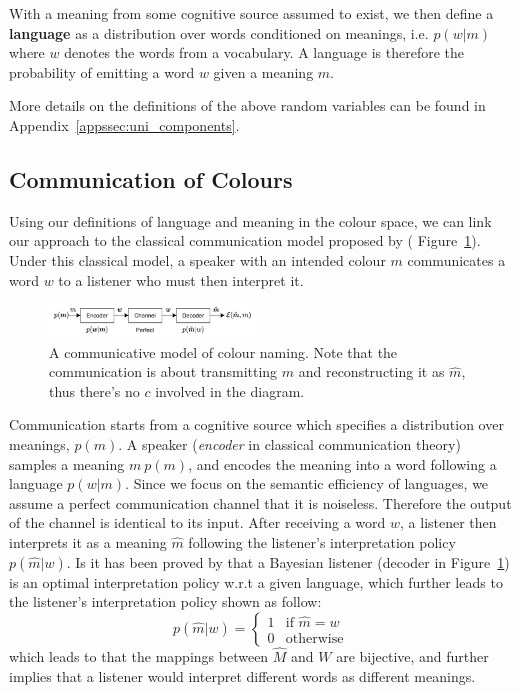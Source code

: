\documentclass[11pt]{article}
\begin{document}
With a meaning from some cognitive source assumed to exist, we then define a \textbf{language} as a distribution over words conditioned on meanings, i.e. $p(w|m)$ where $w$ denotes the words from a vocabulary.
A language is therefore the probability of emitting a word $w$ given a meaning $m$.

More details on the definitions of the above random variables can be found in Appendix~\ref{appssec:uni_components}.

\subsection{Communication of Colours}
\label{ssec:method_comm}

Using our definitions of language and meaning in the colour space, we can link our approach to the classical communication model proposed by \citet{shannon1948mathematical} ( Figure~\ref{fig:pipeline}).
Under this classical model, a speaker with an intended colour $m$ communicates a word $w$ to a listener who must then interpret it.

\begin{figure}[h]
    \centering
    \includegraphics[width=0.49\textwidth]{graphs/cog_communication.pdf}
    \caption{
        A communicative model of colour naming.
        Note that the communication is about transmitting $m$ and reconstructing it as $\hat{m}$, thus there's no $c$ involved in the diagram.
    }
    \label{fig:pipeline}
\end{figure}

Communication starts from a cognitive source which specifies a distribution over meanings, $p(m)$. 
A speaker (\textit{encoder} in classical communication theory) samples a meaning $m~p(m)$, and encodes the meaning into a word following a language $p(w|m)$.
Since we focus on the semantic efficiency of languages, we assume a perfect communication channel that it is noiseless. 
Therefore the output of the channel is identical to its input.
After receiving a word $w$, a listener then interprets it as a meaning $\hat{m}$ following the listener's interpretation policy $p(\hat{m}|w)$.
Is it has been proved by \citet{zaslavsky2018efficient} that a Bayesian listener (decoder in Figure~\ref{fig:pipeline}) is an optimal interpretation policy w.r.t a given language, which further leads to the listener's interpretation policy shown as follow:
\begin{equation}
        p(\hat{m}|w) =
        \begin{cases}
            1 & \text{if $\hat{m}=w$}\\
            0 & \text{otherwise}
        \end{cases} 
        \label{eq:comm_listener}
    \end{equation}
which leads to that the mappings between $\hat{M}$ and $W$ are bijective, and further implies that a listener would interpret different words as different meanings.
\end{document}
